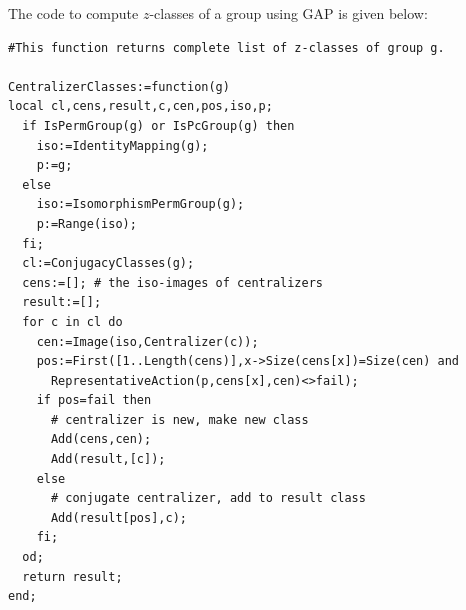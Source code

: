 \documentclass[12pt,twoside,reqno]{amsart}
\theoremstyle{definition}
\numberwithin{equation}{section}
\begin{document}
The code to compute $z$-classes of a group using GAP is given below:
 
\begin{center}
\begin{framed}
\begin{verbatim}
#This function returns complete list of z-classes of group g.

CentralizerClasses:=function(g)
local cl,cens,result,c,cen,pos,iso,p;
  if IsPermGroup(g) or IsPcGroup(g) then
    iso:=IdentityMapping(g);
    p:=g;
  else
    iso:=IsomorphismPermGroup(g);
    p:=Range(iso);
  fi;
  cl:=ConjugacyClasses(g);
  cens:=[]; # the iso-images of centralizers
  result:=[];
  for c in cl do
    cen:=Image(iso,Centralizer(c));
    pos:=First([1..Length(cens)],x->Size(cens[x])=Size(cen) and
      RepresentativeAction(p,cens[x],cen)<>fail);
    if pos=fail then
      # centralizer is new, make new class
      Add(cens,cen);
      Add(result,[c]);
    else
      # conjugate centralizer, add to result class
      Add(result[pos],c); 
    fi;
  od;
  return result;
end;
  
\end{verbatim}
\end{framed}
\end{center}

\printbibliography
\end{document}
